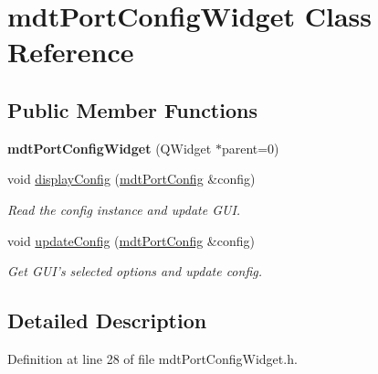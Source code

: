 \hypertarget{classmdt_port_config_widget}{
\section{mdtPortConfigWidget Class Reference}
\label{classmdt_port_config_widget}
}
\subsection*{Public Member Functions}
\begin{DoxyCompactItemize}
\item 
\hypertarget{classmdt_port_config_widget_a5887fadc0001e3438c67de884f8e8f67}{
{\bfseries mdtPortConfigWidget} (QWidget $\ast$parent=0)}
\label{classmdt_port_config_widget_a5887fadc0001e3438c67de884f8e8f67}

\item 
\hypertarget{classmdt_port_config_widget_a44c1690242f5f8680fb4f32a5771534f}{
void \hyperlink{classmdt_port_config_widget_a44c1690242f5f8680fb4f32a5771534f}{displayConfig} (\hyperlink{classmdt_port_config}{mdtPortConfig} \&config)}
\label{classmdt_port_config_widget_a44c1690242f5f8680fb4f32a5771534f}

\begin{DoxyCompactList}\small\item\em Read the config instance and update GUI. \end{DoxyCompactList}\item 
void \hyperlink{classmdt_port_config_widget_a23fba4fe5aa0c07b95a9b85218456456}{updateConfig} (\hyperlink{classmdt_port_config}{mdtPortConfig} \&config)
\begin{DoxyCompactList}\small\item\em Get GUI's selected options and update config. \end{DoxyCompactList}\end{DoxyCompactItemize}


\subsection{Detailed Description}


Definition at line 28 of file mdtPortConfigWidget.h.



